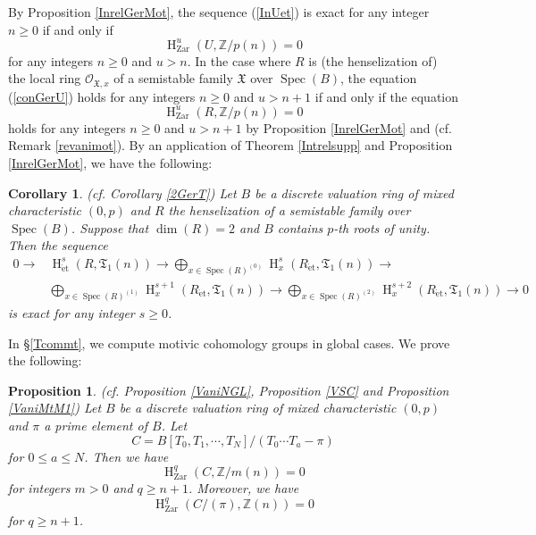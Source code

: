 \documentclass{article}
\newtheorem{prop}[thm]{\indent \sc Proposition}
\newtheorem{cor}[thm]{\indent \sc Corollary}
\newcommand{\spec}{\operatorname{Spec}}
\newcommand{\et}{\mathrm{\acute{e}t}}
\newcommand{\Zar}{\mathrm{Zar}}
\newcommand{\HO}{\operatorname{H}}
\begin{document}
By Proposition \ref{InrelGerMot}, the sequence (\ref{InUet}) is exact for any integer $n\geq 0$
if and only if
%
\begin{equation}\label{conGerU}
\HO_{\Zar}^{u}(
U,
\mathbb{Z}/p(n))=0    
\end{equation}
%
for any integers $n\geq 0$ and $u>n$.
In the case where $R$ is (the henselization of) the local ring $\mathcal{O}_{\mathfrak{X}, x}$
of a semistable family $\mathfrak{X}$ over $\spec(B)$,
the equation (\ref{conGerU}) holds
for any integers $n\geq 0$ and $u>n+1$
if and only if the equation
%
\begin{equation*}
\HO^{u}_{\Zar}(
R,
\mathbb{Z}/p(n)
)    
=0
\end{equation*}
%
holds for any integers $n\geq 0$ and $u>n+1$ by Proposition \ref{InrelGerMot} 
and \cite[Proposition 2.1]{Sak4} 
(cf. Remark \ref{revanimot}).
By an application of Theorem \ref{Intrelsupp} and Proposition \ref{InrelGerMot},
we have the following:

%
\begin{cor}\upshape\label{Int2GerT}(cf. Corollary \ref{2GerT})
Let $B$ be a discrete valuation ring of mixed characteristic $(0, p)$ 
and $R$ the henselization of a semistable family over $\spec(B)$. 
Suppose that $\operatorname{dim}(R)=2$ and $B$ contains $p$-th roots of unity.
Then the sequence
%
\begin{align*}
0
\to  
&\HO^{s}_{\et}(
R, \mathfrak{T}_{1}(n)
)
\to
\bigoplus_{x\in \spec(R)^{(0)}}
\HO^{s}_{x}(
R_{\et},
\mathfrak{T}_{1}(n)
)
\to
\\
&\bigoplus_{x\in \spec(R)^{(1)}}
\HO^{s+1}_{x}(
R_{\et},
\mathfrak{T}_{1}(n)
)
\to
\bigoplus_{x\in \spec(R)^{(2)}}
\HO^{s+2}_{x}(
R_{\et},
\mathfrak{T}_{1}(n)
)
\to 0
\end{align*}
%
is exact for any integer $s\geq 0$.
\end{cor}
%

In \S \ref{Tcommt}, we compute motivic cohomology groups in global cases.
We prove the following:

%
\begin{prop}\upshape\label{IntVaniMot} 
(cf. Proposition \ref{VaniNGL}, Proposition \ref{VSC} and Proposition \ref{VaniMtM1})
Let $B$ be a discrete valuation ring of mixed characteristic $(0, p)$ and $\pi$ a prime element of $B$. 
Let 
%
\begin{equation*}
C=B[T_{0}, T_{1}, \cdots, T_{N}]/(T_{0}\cdots T_{a}-\pi)    
\end{equation*}
%
for $0\leq a\leq N$. Then we have
%
\begin{equation}\label{IntvanC}
\HO^{q}_{\Zar}(
C,
\mathbb{Z}/m(n)
)    
=0
\end{equation}
%
for integers $m>0$ and $q\geq n+1$. Moreover, we have
%
\begin{equation*}
\HO^{q}_{\Zar}(
C/(\pi),
\mathbb{Z}(n)
)=0    
\end{equation*}
%
for $q\geq n+1$.
\end{prop}
%
\end{document}
